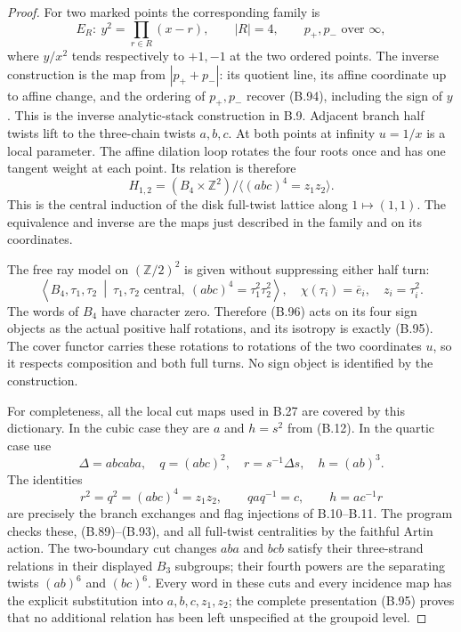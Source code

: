 \begin{proof}
For two marked points the corresponding family is
\[
 E_R:\ y^2=\prod_{r\in R}(x-r),\qquad |R|=4,
       \qquad p_+,p_-\text{ over }\infty,                     \tag{B.94}
\]
where $y/x^2$ tends respectively to $+1,-1$ at the two
ordered points.  The inverse construction is the map from
$|p_++p_-|$: its quotient line, its affine coordinate up to
affine change, and the ordering of $p_+,p_-$ recover (B.94),
including the sign of $y$.  This is the inverse analytic-stack
construction in B.9.  Adjacent branch half twists lift to
the three-chain twists $a,b,c$.  At both points at infinity
$u=1/x$ is a local parameter.  The affine dilation loop
rotates the four roots once and has one tangent weight at
each point.  Its relation is therefore
\[
 H_{1,2}=(B_4\times\mathbb Z^2)
       /\langle (abc)^4=z_1z_2\rangle.                         \tag{B.95}
\]
This is the central induction of the disk full-twist lattice
along $1\mapsto(1,1)$.  The equivalence and inverse are the
maps just described in the family and on its coordinates.

The free ray model on $(\mathbb Z/2)^2$ is given without
suppressing either half turn:
\[
 \left\langle B_4,\tau_1,\tau_2\ \middle|\
 \tau_1,\tau_2\text{ central},\
       (abc)^4=\tau_1^2\tau_2^2\right\rangle,
 \quad\chi(\tau_i)=\overline e_i,
 \quad z_i=\tau_i^2.                                         \tag{B.96}
\]
The words of $B_4$ have character zero.  Therefore (B.96)
acts on its four sign objects as the actual positive half
rotations, and its isotropy is exactly (B.95).  The cover
functor carries these rotations to rotations of the two
coordinates $u$, so it respects composition and both full
turns.  No sign object is identified by the construction.

For completeness, all the local cut maps used in B.27 are
covered by this dictionary.  In the cubic case they are
$a$ and $h=s^2$ from (B.12).  In the quartic case use
\[
 \Delta=abcaba,\quad q=(abc)^2,\quad
 r=s^{-1}\Delta s,\quad h=(ab)^3.
\]
The identities
\[
 r^2=q^2=(abc)^4=z_1z_2,\qquad
 qaq^{-1}=c,\qquad h=ac^{-1}r
                                                               \tag{B.97}
\]
are precisely the branch exchanges and flag injections
of B.10--B.11.  The program checks these, (B.89)--(B.93),
and all full-twist centralities by the faithful Artin action.
The two-boundary cut changes $aba$ and $bcb$ satisfy their
three-strand relations in their displayed $B_3$ subgroups;
their fourth powers are the separating twists $(ab)^6$ and
$(bc)^6$.  Every word in these cuts and every incidence map
has the explicit substitution into $a,b,c,z_1,z_2$; the
complete presentation (B.95) proves that no additional
relation has been left unspecified at the groupoid level.


\end{proof}
